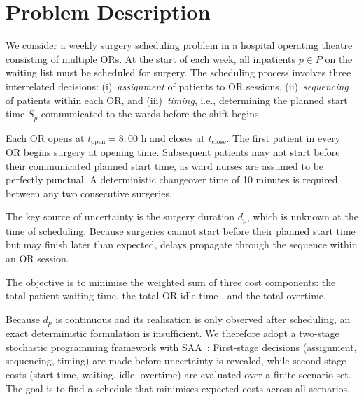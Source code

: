 \section{Problem Description}

We consider a weekly surgery scheduling problem in a hospital operating theatre 
consisting of multiple ORs. At the start of each week, all 
inpatients $p \in P$ on the waiting list must be scheduled for surgery. The 
scheduling process involves three interrelated decisions: (i)~\textit{assignment} 
of patients to OR sessions, (ii)~\textit{sequencing} of patients within each OR, 
and (iii)~\textit{timing}, i.e., determining the planned start time $S_p$ 
communicated to the wards before the shift begins.

Each OR opens at $t_{\text{open}} = 8{:}00$ h and closes at $t_{\text{close}}$. 
The first patient in every OR begins surgery at opening time. Subsequent patients 
may not start before their communicated planned start time, as ward nurses are 
assumed to be perfectly punctual. A deterministic changeover time of 10 minutes 
is required between any two consecutive surgeries.

The key source of uncertainty is the surgery duration $d_p$, which is unknown at 
the time of scheduling. Because surgeries cannot start 
before their planned start time but may finish later than expected, delays 
propagate through the sequence within an OR session.

The objective is to minimise the weighted sum of three cost components: the total patient waiting time, the total OR idle time , and the 
total overtime. 

Because $d_p$ is continuous and its realisation is only observed after scheduling, 
an exact deterministic formulation is insufficient. We therefore adopt a 
two-stage stochastic programming framework with SAA~\cite{Kleywegt}: First-stage decisions (assignment, 
sequencing, timing) are made before uncertainty is revealed, while second-stage 
costs (start time, waiting, idle, overtime) are evaluated over a finite scenario set. The goal is to find a schedule that minimises 
expected costs across all scenarios. 
